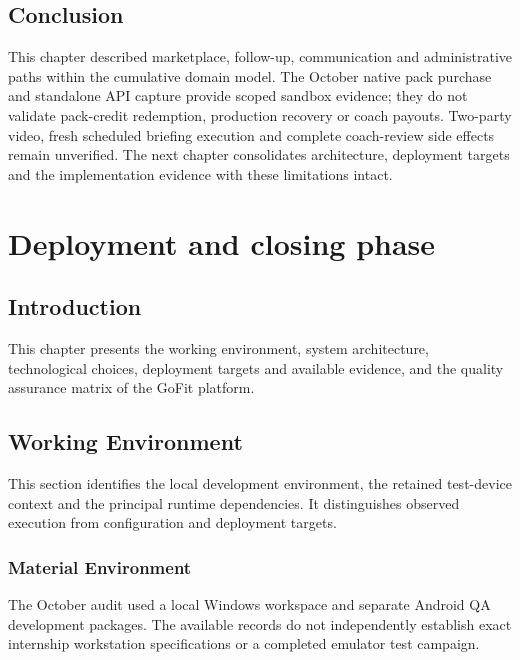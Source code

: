 \documentclass[12pt,a4paper,openany]{report}
\begin{document}
\section*{Conclusion}

\enlargethispage{\baselineskip}
This chapter described marketplace, follow-up, communication and administrative paths within the cumulative domain model. The October native pack purchase and standalone API capture provide scoped sandbox evidence; they do not validate pack-credit redemption, production recovery or coach payouts. Two-party video, fresh scheduled briefing execution and complete coach-review side effects remain unverified. The next chapter consolidates architecture, deployment targets and the implementation evidence with these limitations intact.


\chapter{Deployment and closing phase}

{}
\section*{Introduction}

This chapter presents the working environment, system architecture, technological choices, deployment targets and available evidence, and the quality assurance matrix of the GoFit platform.


\section{Working Environment}

This section identifies the local development environment, the retained test-device context and the principal runtime dependencies. It distinguishes observed execution from configuration and deployment targets.

\subsection{Material Environment}

The October audit used a local Windows workspace and separate Android QA development packages. The available records do not independently establish exact internship workstation specifications or a completed emulator test campaign.
\end{document}

